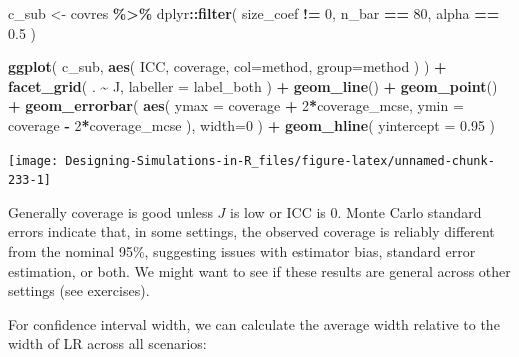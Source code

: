 \documentclass[
]{book}
\newenvironment{Shaded}{\begin{snugshade}}{\end{snugshade}}
\newcommand{\AttributeTok}[1]{\textcolor[rgb]{0.13,0.29,0.53}{#1}}
\newcommand{\DecValTok}[1]{\textcolor[rgb]{0.00,0.00,0.81}{#1}}
\newcommand{\FloatTok}[1]{\textcolor[rgb]{0.00,0.00,0.81}{#1}}
\newcommand{\FunctionTok}[1]{\textcolor[rgb]{0.13,0.29,0.53}{\textbf{#1}}}
\newcommand{\NormalTok}[1]{#1}
\newcommand{\OtherTok}[1]{\textcolor[rgb]{0.56,0.35,0.01}{#1}}
\newcommand{\SpecialCharTok}[1]{\textcolor[rgb]{0.81,0.36,0.00}{\textbf{#1}}}
\begin{document}
\begin{Shaded}
\begin{Highlighting}[]
\NormalTok{c\_sub }\OtherTok{\textless{}{-}}\NormalTok{ covres }\SpecialCharTok{\%\textgreater{}\%}
\NormalTok{  dplyr}\SpecialCharTok{::}\FunctionTok{filter}\NormalTok{( size\_coef }\SpecialCharTok{!=} \DecValTok{0}\NormalTok{, n\_bar }\SpecialCharTok{==} \DecValTok{80}\NormalTok{, alpha }\SpecialCharTok{==} \FloatTok{0.5}\NormalTok{ )}

\FunctionTok{ggplot}\NormalTok{( c\_sub, }\FunctionTok{aes}\NormalTok{( ICC, coverage, }\AttributeTok{col=}\NormalTok{method, }\AttributeTok{group=}\NormalTok{method ) ) }\SpecialCharTok{+}
  \FunctionTok{facet\_grid}\NormalTok{( . }\SpecialCharTok{\textasciitilde{}}\NormalTok{ J, }\AttributeTok{labeller =}\NormalTok{ label\_both ) }\SpecialCharTok{+}
  \FunctionTok{geom\_line}\NormalTok{() }\SpecialCharTok{+}
  \FunctionTok{geom\_point}\NormalTok{() }\SpecialCharTok{+}
  \FunctionTok{geom\_errorbar}\NormalTok{( }\FunctionTok{aes}\NormalTok{( }\AttributeTok{ymax =}\NormalTok{ coverage }\SpecialCharTok{+} \DecValTok{2}\SpecialCharTok{*}\NormalTok{coverage\_mcse, }
                      \AttributeTok{ymin =}\NormalTok{ coverage }\SpecialCharTok{{-}} \DecValTok{2}\SpecialCharTok{*}\NormalTok{coverage\_mcse ), }\AttributeTok{width=}\DecValTok{0}\NormalTok{ ) }\SpecialCharTok{+}
  \FunctionTok{geom\_hline}\NormalTok{( }\AttributeTok{yintercept =} \FloatTok{0.95}\NormalTok{ )}
\end{Highlighting}
\end{Shaded}

\begin{center}\texttt{[image: Designing-Simulations-in-R\_files/figure-latex/unnamed-chunk-233-1]} \end{center}

Generally coverage is good unless \(J\) is low or ICC is 0.
Monte Carlo standard errors indicate that, in some settings, the observed coverage is reliably different from the nominal 95\%, suggesting issues with estimator bias, standard error estimation, or both.
We might want to see if these results are general across other settings (see exercises).

For confidence interval width, we can calculate the average width relative to the width of LR across all scenarios:
\end{document}
